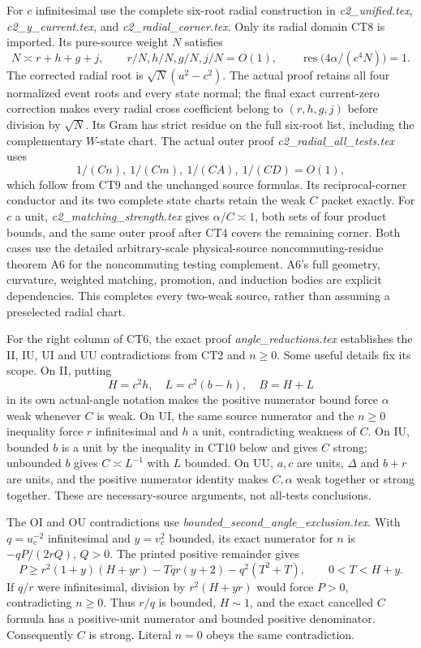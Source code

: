 For \(c\) infinitesimal use the complete six-root radial construction
in \emph{c2\_unified.tex}, \emph{c2\_y\_current.tex}, and
\emph{c2\_radial\_corner.tex}.  Only its radial domain CT8 is imported.
Its pure-source weight \(N\) satisfies
\[
 N\asymp r+h+g+j,\qquad
 r/N,h/N,g/N,j/N=O(1),\qquad
 \operatorname{res}\bigl(4\alpha/(c^4N)\bigr)=1.          \tag{CT9}
\]
The corrected radial root is \(\sqrt N(u^2-c^2)\).
The actual proof retains all four normalized event roots and every
state normal; the final exact current-zero correction makes every
radial cross coefficient belong to \((r,h,g,j)\) before division
by \(\sqrt N\).  Its Gram has strict residue on the full six-root
list, including the complementary \(W\)-state chart.
The actual outer proof \emph{c2\_radial\_all\_tests.tex}
uses
\[
             1/(Cn),\ 1/(Cm),\ 1/(CA),\ 1/(CD)=O(1),
\]
which follow from
CT9 and the unchanged source formulas.  Its reciprocal-corner
conductor and its two complete state charts retain the weak \(C\)
packet exactly.
For \(c\) a unit, \emph{c2\_matching\_strength.tex} gives
\(\alpha/C\asymp1\), both sets of four product bounds, and the
same outer proof after CT4 covers the remaining corner.
Both cases use the detailed arbitrary-scale physical-source
noncommuting-residue theorem A6 for the noncommuting testing
complement.  A6's full geometry, curvature, weighted matching,
promotion, and induction bodies are explicit dependencies.
This completes every two-weak source, rather than assuming a
preselected radial chart.

For the right column of CT6, the exact proof
\emph{angle\_reductions.tex} establishes the II, IU, UI and UU
contradictions from CT2 and \(n\geq0\).
Some useful details fix its scope.  On II, putting
\[
 H=c^2h,\quad L=c^2(b-h),\quad B=H+L
\]
in its own actual-angle notation makes the positive numerator
bound force \(\alpha\) weak whenever \(C\) is weak.  On UI, the
same source numerator and the \(n\geq0\) inequality force
\(r\) infinitesimal and \(h\) a unit, contradicting weakness
of \(C\).  On IU, bounded \(b\) is a unit by the inequality in
CT10 below and gives \(C\) strong; unbounded \(b\) gives
\(C\asymp L^{-1}\) with \(L\) bounded.  On UU, \(a,c\) are units,
\(\Delta\) and \(b+r\) are units, and the positive numerator
identity makes \(C,\alpha\) weak together or strong together.
These are necessary-source arguments, not all-tests conclusions.

The OI and OU contradictions use
\emph{bounded\_second\_angle\_exclusion.tex}.
With \(q=u_c^{-2}\) infinitesimal and \(y=v_c^2\) bounded, its
exact numerator for \(n\) is \(-qP/(2rQ)\), \(Q>0\).
The printed positive remainder gives
\[
 P\geq r^2(1+y)(H+yr)-Tqr(y+2)-q^2(T^2+T),\qquad
 0<T<H+y .
\]
If \(q/r\) were infinitesimal, division by \(r^2(H+yr)\)
would force \(P>0\), contradicting \(n\geq0\).
Thus \(r/q\) is bounded, \(H\sim1\), and the exact cancelled
\(C\) formula has a positive-unit numerator and bounded
positive denominator.  Consequently \(C\) is strong.  Literal
\(n=0\) obeys the same contradiction.

